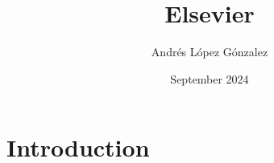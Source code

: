 \documentclass{article}
\title{Elsevier}
\author{Andrés López Gónzalez}
\date{September 2024}
\begin{document}
\maketitle

\section{Introduction}
\end{document}
